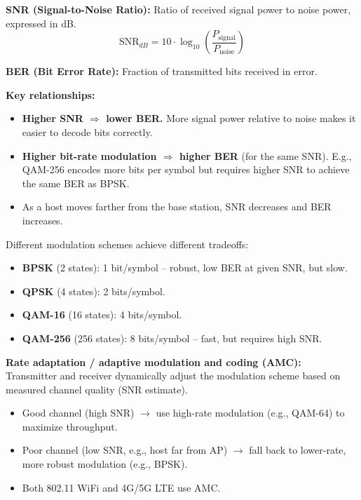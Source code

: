 \begin{formulabox}
\textbf{SNR (Signal-to-Noise Ratio):} Ratio of received signal power to noise power, expressed in dB.
\[ \text{SNR}_{dB} = 10 \cdot \log_{10}\!\left(\frac{P_\text{signal}}{P_\text{noise}}\right) \]

\textbf{BER (Bit Error Rate):} Fraction of transmitted bits received in error.

\medskip
\textbf{Key relationships:}
\begin{itemize}[noitemsep]
    \item \textbf{Higher SNR $\Rightarrow$ lower BER.} More signal power relative to noise makes it easier to decode bits correctly.
    \item \textbf{Higher bit-rate modulation $\Rightarrow$ higher BER} (for the same SNR). E.g., QAM-256 encodes more bits per symbol but requires higher SNR to achieve the same BER as BPSK.
    \item As a host moves farther from the base station, SNR decreases and BER increases.
\end{itemize}
\end{formulabox}

\begin{keybox}
Different modulation schemes achieve different tradeoffs:
\begin{itemize}[noitemsep]
    \item \textbf{BPSK} (2 states): 1 bit/symbol -- robust, low BER at given SNR, but slow.
    \item \textbf{QPSK} (4 states): 2 bits/symbol.
    \item \textbf{QAM-16} (16 states): 4 bits/symbol.
    \item \textbf{QAM-256} (256 states): 8 bits/symbol -- fast, but requires high SNR.
\end{itemize}

\medskip
\textbf{Rate adaptation / adaptive modulation and coding (AMC):}\\
Transmitter and receiver dynamically adjust the modulation scheme based on measured channel quality (SNR estimate).
\begin{itemize}[noitemsep]
    \item Good channel (high SNR) $\rightarrow$ use high-rate modulation (e.g., QAM-64) to maximize throughput.
    \item Poor channel (low SNR, e.g., host far from AP) $\rightarrow$ fall back to lower-rate, more robust modulation (e.g., BPSK).
    \item Both 802.11 WiFi and 4G/5G LTE use AMC.
\end{itemize}
\end{keybox}

